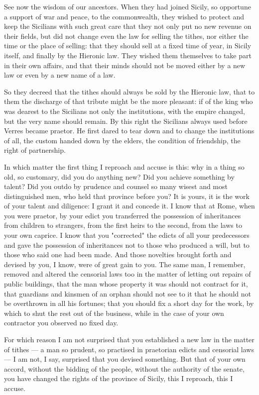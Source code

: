  See now the wisdom of our ancestors. When they had joined Sicily, so opportune a support of war and peace, to the commonwealth, they wished to protect and keep the Sicilians with such great care that they not only put no new revenue on their fields, but did not change even the law for selling the tithes, nor either the time or the place of selling: that they should sell at a fixed time of year, in Sicily itself, and finally by the Hieronic law. They wished them themselves to take part in their own affairs, and that their minds should not be moved either by a new law or even by a new name of a law.

 So they decreed that the tithes should always be sold by the Hieronic law, that to them the discharge of that tribute might be the more pleasant: if of the king who was dearest to the Sicilians not only the institutions, with the empire changed, but the very name should remain. By this right the Sicilians always used before Verres became praetor. He first dared to tear down and to change the institutions of all, the custom handed down by the elders, the condition of friendship, the right of partnership.

 In which matter the first thing I reproach and accuse is this: why in a thing so old, so customary, did you do anything new? Did you achieve something by talent? Did you outdo by prudence and counsel so many wisest and most distinguished men, who held that province before you? It is yours, it is the work of your talent and diligence: I grant it and concede it. I know that at Rome, when you were praetor, by your edict you transferred the possession of inheritances from children to strangers, from the first heirs to the second, from the laws to your own caprice. I know that you "corrected" the edicts of all your predecessors and gave the possession of inheritances not to those who produced a will, but to those who said one had been made. And those novelties brought forth and devised by you, I know, were of great gain to you. The same man, I remember, removed and altered the censorial laws too in the matter of letting out repairs of public buildings, that the man whose property it was should not contract for it, that guardians and kinsmen of an orphan should not see to it that he should not be overthrown in all his fortunes; that you should fix a short day for the work, by which to shut the rest out of the business, while in the case of your own contractor you observed no fixed day.

 For which reason I am not surprised that you established a new law in the matter of tithes --- a man so prudent, so practised in praetorian edicts and censorial laws --- I am not, I say, surprised that you devised something. But that of your own accord, without the bidding of the people, without the authority of the senate, you have changed the rights of the province of Sicily, this I reproach, this I accuse.

